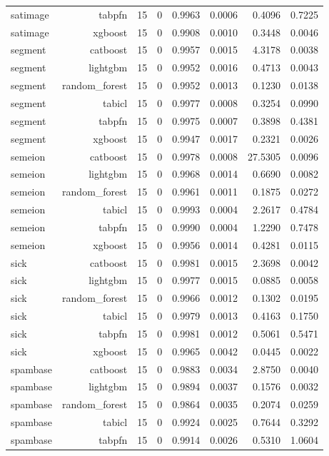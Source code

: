 \begin{table}[htbp]
\begin{tabular}{lrrrrrrr}
satimage & tabpfn & 15 & 0 & 0.9963 & 0.0006 & 0.4096 & 0.7225 \\
satimage & xgboost & 15 & 0 & 0.9908 & 0.0010 & 0.3448 & 0.0046 \\
segment & catboost & 15 & 0 & 0.9957 & 0.0015 & 4.3178 & 0.0038 \\
segment & lightgbm & 15 & 0 & 0.9952 & 0.0016 & 0.4713 & 0.0043 \\
segment & random\_forest & 15 & 0 & 0.9952 & 0.0013 & 0.1230 & 0.0138 \\
segment & tabicl & 15 & 0 & 0.9977 & 0.0008 & 0.3254 & 0.0990 \\
segment & tabpfn & 15 & 0 & 0.9975 & 0.0007 & 0.3898 & 0.4381 \\
segment & xgboost & 15 & 0 & 0.9947 & 0.0017 & 0.2321 & 0.0026 \\
semeion & catboost & 15 & 0 & 0.9978 & 0.0008 & 27.5305 & 0.0096 \\
semeion & lightgbm & 15 & 0 & 0.9968 & 0.0014 & 0.6690 & 0.0082 \\
semeion & random\_forest & 15 & 0 & 0.9961 & 0.0011 & 0.1875 & 0.0272 \\
semeion & tabicl & 15 & 0 & 0.9993 & 0.0004 & 2.2617 & 0.4784 \\
semeion & tabpfn & 15 & 0 & 0.9990 & 0.0004 & 1.2290 & 0.7478 \\
semeion & xgboost & 15 & 0 & 0.9956 & 0.0014 & 0.4281 & 0.0115 \\
sick & catboost & 15 & 0 & 0.9981 & 0.0015 & 2.3698 & 0.0042 \\
sick & lightgbm & 15 & 0 & 0.9977 & 0.0015 & 0.0885 & 0.0058 \\
sick & random\_forest & 15 & 0 & 0.9966 & 0.0012 & 0.1302 & 0.0195 \\
sick & tabicl & 15 & 0 & 0.9979 & 0.0013 & 0.4163 & 0.1750 \\
sick & tabpfn & 15 & 0 & 0.9981 & 0.0012 & 0.5061 & 0.5471 \\
sick & xgboost & 15 & 0 & 0.9965 & 0.0042 & 0.0445 & 0.0022 \\
spambase & catboost & 15 & 0 & 0.9883 & 0.0034 & 2.8750 & 0.0040 \\
spambase & lightgbm & 15 & 0 & 0.9894 & 0.0037 & 0.1576 & 0.0032 \\
spambase & random\_forest & 15 & 0 & 0.9864 & 0.0035 & 0.2074 & 0.0259 \\
spambase & tabicl & 15 & 0 & 0.9924 & 0.0025 & 0.7644 & 0.3292 \\
spambase & tabpfn & 15 & 0 & 0.9914 & 0.0026 & 0.5310 & 1.0604 \\

\end{tabular}
\end{table}
